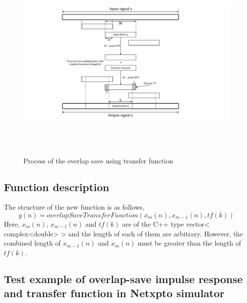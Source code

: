 \begin{refsection}
\begin{figure}[h]
	\centering
	\includegraphics[height=10cm,width=18cm]{./algorithms/overlap_save/figures/overlap-save_method_tf.pdf}
	\caption{Process of the overlap save using transfer function}\label{osTf}
\end{figure}

\subsection*{Function description}
The structure of the new function is as follows,
\begin{equation*}
y(n) =overlapSaveTransferFunction(x_{m}(n), x_{m-1}(n), tf(k))
\end{equation*}
Here, $x_{m}(n)$, $x_{m-1}(n)$ and $tf(k)$ are of the C++ type vector< complex<double> > and the length of each of them are arbitrary. However, the combined length of $x_{m-1}(n)$ and $x_{m}(n)$ must be greater than the length of $tf(k)$.

\subsection*{Test example of overlap-save impulse response and transfer function in Netxpto simulator}


\end{refsection}
